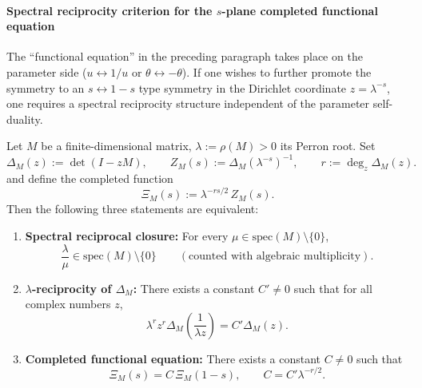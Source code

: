 \paragraph{Spectral reciprocity criterion for the \texorpdfstring{$s$}{s}-plane completed functional equation}\label{par:s-plane-functional-eq-criterion}
The ``functional equation'' in the preceding paragraph takes place on the parameter side ($u\leftrightarrow 1/u$ or $\theta\leftrightarrow-\theta$).
If one wishes to further promote the symmetry to an
\(
s\leftrightarrow 1-s
\)
type symmetry in the Dirichlet coordinate $z=\lambda^{-s}$, one requires a spectral reciprocity structure independent of the parameter self-duality.

\begin{proposition}\label{prop:reciprocal-spectrum-functional-equation}
Let $M$ be a finite-dimensional matrix, $\lambda:=\rho(M)>0$ its Perron root. Set
\[
\Delta_M(z):=\det(I-zM),\qquad
Z_M(s):=\Delta_M(\lambda^{-s})^{-1},
\qquad
r:=\deg_z\Delta_M(z).
\]
and define the completed function
\[
\Xi_M(s):=\lambda^{-rs/2}\,Z_M(s).
\]
Then the following three statements are equivalent:
\begin{enumerate}
  \item \textbf{Spectral reciprocal closure:} For every \(\mu\in\mathrm{spec}(M)\setminus\{0\}\),
  \[
  \frac{\lambda}{\mu}\in\mathrm{spec}(M)\setminus\{0\}
  \qquad(\text{counted with algebraic multiplicity}).
  \]
  \item \textbf{\(\lambda\)-reciprocity of \(\Delta_M\):} There exists a constant \(C'\neq 0\) such that for all complex numbers \(z\),
  \[
  \lambda^{r}z^{r}\Delta_M\!\left(\frac{1}{\lambda z}\right)=C'\Delta_M(z).
  \]
  \item \textbf{Completed functional equation:} There exists a constant \(C\neq 0\) such that
  \[
  \Xi_M(s)=C\,\Xi_M(1-s),
  \qquad C=C'\lambda^{-r/2}.
  \]
\end{enumerate}
\end{proposition}
